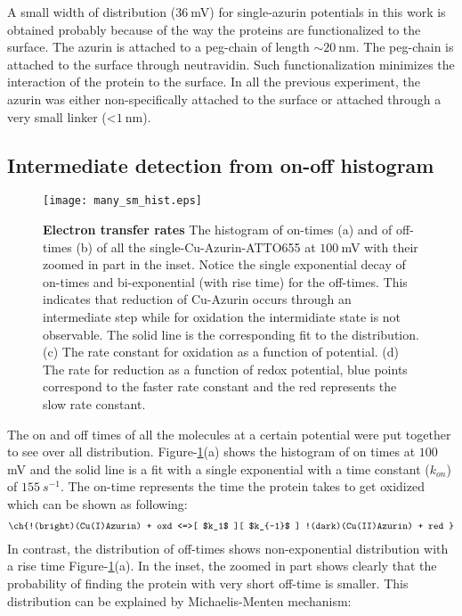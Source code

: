 A small width of distribution ($36~$mV) for single-azurin potentials in this work is obtained probably because of the way the proteins are functionalized to the surface. The azurin is attached to a peg-chain of length ${\sim}20~$nm. The peg-chain is attached to the surface through neutravidin. Such functionalization minimizes the interaction of the protein to the surface. In all the previous experiment, the azurin was either non-specifically attached to the surface or attached through a very small linker (<$1~$nm).
\subsection{Intermediate detection from on-off histogram}
\begin{figure}
	\centering
	\texttt{[image: many\_sm\_hist.eps]}
	\caption{\textbf{Electron transfer rates} The histogram of on-times (a) and of off-times (b) of all the single-Cu-Azurin-ATTO655 at $100~$mV with their zoomed in part in the inset. Notice the single exponential decay of on-times and bi-exponential (with rise time) for the off-times. This indicates that  reduction of Cu-Azurin occurs through an intermediate step while for oxidation the intermidiate state is not observable. The solid line is the corresponding fit to the distribution. (c) The rate constant for oxidation as a function of potential. (d) The rate for reduction as a function of redox potential, blue points correspond to the faster rate constant and the red represents the slow rate constant.}
	\label{fig:many_sm_hist}
\end{figure}
The on and off times of all the molecules at a certain potential were put together to see over all distribution. Figure-\ref{fig:many_sm_hist}(a) shows the histogram of on times at $100~$mV and the solid line is a fit with a single exponential with a time constant ($k_{on}$) of $155~s^{-1}$. The on-time represents the time the protein takes to get oxidized which can be shown as following:
\begin{align}
	\ch{!(bright)(Cu(I)Azurin) + oxd <=>[ $k_1$ ][ $k_{-1}$ ] !(dark)(Cu(II)Azurin) + red }
	\label{eq:oxidation}
\end{align}
In contrast, the distribution of off-times shows non-exponential distribution with a rise time Figure-\ref{fig:many_sm_hist}(a). In the inset, the zoomed in part shows clearly that the probability of finding the protein with very short off-time is smaller. This distribution can be explained by Michaelis-Menten mechanism:
